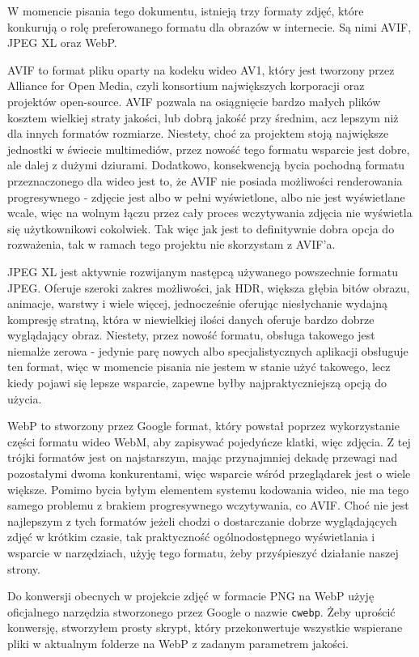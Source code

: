 \documentclass[licencjacka]{pracadypl}
\begin{document}
W momencie pisania tego dokumentu, istnieją trzy formaty zdjęć, które konkurują o rolę preferowanego formatu dla obrazów w internecie. Są nimi AVIF, JPEG XL oraz WebP. 

AVIF to format pliku oparty na kodeku wideo AV1, który jest tworzony przez Alliance for Open Media, czyli konsortium największych korporacji oraz projektów open-source. AVIF pozwala na osiągnięcie bardzo małych plików kosztem wielkiej straty jakości, lub dobrą jakość przy średnim, acz lepszym niż dla innych formatów rozmiarze. Niestety, choć za projektem stoją największe jednostki w świecie multimediów, przez nowość tego formatu wsparcie jest dobre, ale dalej z dużymi dziurami. Dodatkowo, konsekwencją bycia pochodną formatu przeznaczonego dla wideo jest to, że AVIF nie posiada możliwości renderowania progresywnego - zdjęcie jest albo w pełni wyświetlone, albo nie jest wyświetlane wcale, więc na wolnym łączu przez cały proces wczytywania zdjęcia nie wyświetla się użytkownikowi cokolwiek. Tak więc jak jest to definitywnie dobra opcja do rozważenia, tak w ramach tego projektu nie skorzystam z AVIF'a.

JPEG XL jest aktywnie rozwijanym następcą używanego powszechnie formatu JPEG. Oferuje szeroki zakres możliwości, jak HDR, większa głębia bitów obrazu, animacje, warstwy i wiele więcej, jednocześnie oferując niesłychanie wydajną kompresję stratną, która w niewielkiej ilości danych oferuje bardzo dobrze wyglądający obraz. Niestety, przez nowość formatu, obsługa takowego jest niemalże zerowa - jedynie parę nowych albo specjalistycznych aplikacji obsługuje ten format, więc w momencie pisania nie jestem w stanie użyć takowego, lecz kiedy pojawi się lepsze wsparcie, zapewne byłby najpraktyczniejszą opcją do użycia.

WebP to stworzony przez Google format, który powstał poprzez wykorzystanie części formatu wideo WebM, aby zapisywać pojedyńcze klatki, więc zdjęcia. Z tej trójki formatów jest on najstarszym, mając przynajmniej dekadę przewagi nad pozostałymi dwoma konkurentami, więc wsparcie wśród przeglądarek jest o wiele większe. Pomimo bycia byłym elementem systemu kodowania wideo, nie ma tego samego problemu z brakiem progresywnego wczytywania, co AVIF. Choć nie jest najlepszym z tych formatów jeżeli chodzi o dostarczanie dobrze wyglądających zdjęć w krótkim czasie, tak praktyczność ogólnodostępnego wyświetlania i wsparcie w narzędziach, użyję tego formatu, żeby przyśpieszyć działanie naszej strony.

Do konwersji obecnych w projekcie zdjęć w formacie PNG na WebP użyję oficjalnego narzędzia stworzonego przez Google o nazwie \verb|cwebp|. Żeby uprościć konwersję, stworzyłem prosty skrypt, który przekonwertuje wszystkie wspierane pliki w aktualnym folderze na WebP z zadanym parametrem jakości. 
\end{document}
